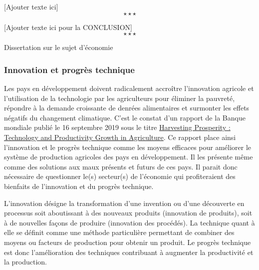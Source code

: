 [Ajouter texte ici] $$\star \star \star$$


{[Ajouter texte ici pour la CONCLUSION]} $$\star \star \star$$




\newpage 
\begin{bclogo}[barre=none,logo={}]{Dissertation sur le sujet d'économie}
	\begin{center}
		\subsubsection*{Innovation et progrès technique}
	\end{center}
\end{bclogo}



	\hspace*{.5cm}Les pays en développement doivent radicalement accroître l'innovation agricole et l'utilisation de la technologie par les agriculteurs pour éliminer la pauvreté, répondre à la demande croissante de denrées alimentaires et surmonter les effets négatifs du changement climatique. C'est le constat d'un rapport de la Banque mondiale publié le 16 septembre 2019 sous le titre \uline{Harvesting Prosperity : Technology and Productivity Growth in Agriculture}. Ce rapport place ainsi l'innovation et le progrès technique comme les moyens efficaces pour améliorer le système de production agricoles des pays en développement. Il les présente même comme des solutions aux maux présents et futurs de ces pays. Il parait donc nécessaire de questionner le(s) secteur(s) de l'économie qui profiteraient des bienfaits de l'innovation et du progrès technique. 
	
	\hspace*{.5cm}L'innovation désigne la transformation d'une invention ou d'une découverte en processus soit aboutissant à des nouveaux produits (innovation de produits), soit à de nouvelles façons de produire (innovation des procédés). La technique quant à elle se définit comme une méthode particulière permettant de combiner des moyens ou facteurs de production pour obtenir un produit. Le progrès technique est donc l'amélioration des techniques contribuant à augmenter la productivité et la production.  
	
